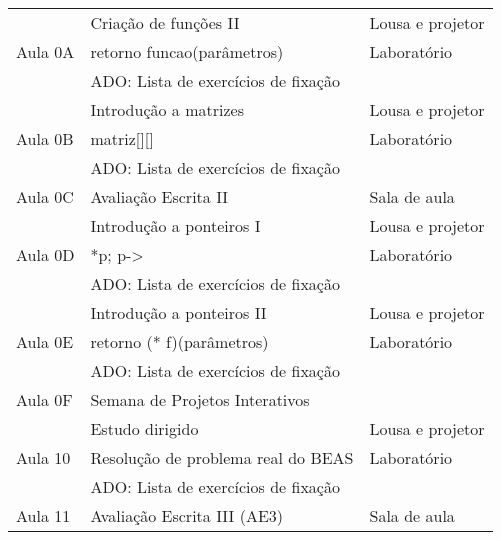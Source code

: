 \documentclass[a4paper]{article}
\begin{document}
\begin{longtable}{lll}
            \multirow{3}{*}{Aula 0A} & Criação de funções II                           & Lousa e projetor \\ \cmidrule{2-3}
                                     & retorno funcao(parâmetros)                      & Laboratório      \\ \cmidrule{2-3}
                                     & ADO: Lista de exercícios de fixação                                \\ \midrule

            \multirow{3}{*}{Aula 0B} & Introdução a matrizes                           & Lousa e projetor \\ \cmidrule{2-3}
                                     & matriz[][]                                      & Laboratório      \\ \cmidrule{2-3}
                                     & ADO: Lista de exercícios de fixação                                \\ \midrule

            Aula 0C                  & Avaliação Escrita II                            & Sala de aula     \\ \midrule

            \multirow{3}{*}{Aula 0D} & Introdução a ponteiros I                        & Lousa e projetor \\ \cmidrule{2-3}
                                     & *p; p->                                         & Laboratório      \\ \cmidrule{2-3}
                                     & ADO: Lista de exercícios de fixação                                \\ \midrule

            \multirow{3}{*}{Aula 0E} & Introdução a ponteiros II                       & Lousa e projetor \\ \cmidrule{2-3}
                                     & retorno (* f)(parâmetros)                       & Laboratório      \\ \cmidrule{2-3}
                                     & ADO: Lista de exercícios de fixação                                \\ \midrule

            Aula 0F                  & Semana de Projetos Interativos                  &                  \\ \midrule

            \multirow{3}{*}{Aula 10} & Estudo dirigido                                 & Lousa e projetor \\ \cmidrule{2-3}
                                     & Resolução de problema real do BEAS              & Laboratório      \\ \cmidrule{2-3}
                                     & ADO: Lista de exercícios de fixação                                \\ \midrule

            Aula 11                  & Avaliação Escrita III (AE3)                     & Sala de aula     \\ \bottomrule

        \end{longtable}
\end{document}
